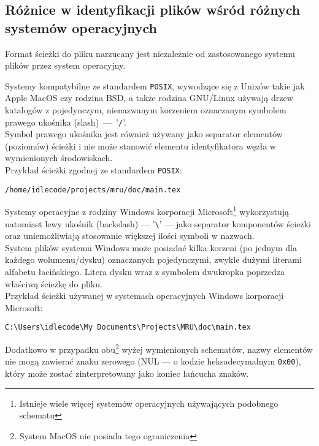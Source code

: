 \subsection{Różnice w identyfikacji plików wśród różnych systemów operacyjnych}
\par
Format ścieżki do pliku narzucany jest niezależnie od zastosowanego systemu plików przez system operacyjny.

\par
Systemy kompatybilne ze standardem \texttt{POSIX}, wywodzące się z Unixów takie jak Apple MacOS czy rodzina BSD, a także rodzina GNU/Linux używają drzew katalogów z pojedynczym, nienazwanym korzeniem oznaczanym symbolem prawego ukośnika (slash)~---~'\texttt{/}'.\\
Symbol prawego ukośnika jest również używany jako separator elementów (poziomów) ścieżki i nie może stanowić elementu identyfikatora węzła w wymienionych środowiskach.\\
Przykład ścieżki zgodnej ze standardem \texttt{POSIX}:
\begin{center}
\texttt{/home/idlecode/projects/mru/doc/main.tex}
\end{center}

\par
Systemy operacyjne z rodziny Windows korporacji Microsoft\footnote{Istnieje wiele więcej systemów operacyjnych używających podobnego schematu} wykorzystują natomiast lewy ukośnik (backslash) --- '\texttt{\textbackslash}' --- jako separator komponentów ścieżki oraz uniemożliwiają stosowanie większej ilości symboli w nazwach.\\
System plików systemu Windows może posiadać kilka korzeni (po jednym dla każdego wolumenu/dysku) oznaczanych pojedynczymi, zwykle dużymi literami alfabetu łacińskiego. Litera dysku wraz z symbolem dwukropka poprzedza właściwą ścieżkę do pliku.\\
Przykład ścieżki używanej w systemach operacyjnych Windows korporacji Microsoft:
\begin{center}
\texttt{C:\textbackslash Users\textbackslash idlecode\textbackslash My Documents\textbackslash Projects\textbackslash MRU\textbackslash doc\textbackslash main.tex}
\end{center}

\par
Dodatkowo w przypadku obu\footnote{System MacOS nie posiada tego ograniczenia} wyżej wymienionych schematów, nazwy elementów nie mogą zawierać znaku zerowego (NUL --- o kodzie heksadecymalnym \texttt{0x00}), który może zostać zinterpretowany jako koniec łańcucha znaków.


